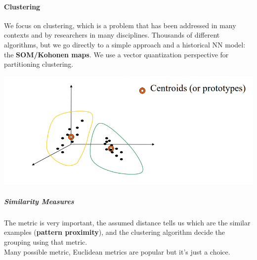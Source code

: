 \documentclass[10pt]{report}
\begin{document}
\paragraph{Clustering} We focus on clustering, which is a problem that has been addressed in many contexts and by researchers in many disciplines. Thousands of different algorithms, but we go directly to a simple approach and a historical NN model: the \textbf{SOM/Kohonen maps}. We use a vector quantization perspective for partitioning clustering.
\begin{center}
	\includegraphics[scale=0.5]{31.png}
\end{center}
\subparagraph{Similarity Measures} The metric is very important, the assumed distance tells us which are the similar examples (\textbf{pattern proximity}), and the clustering algorithm decide the grouping using that metric.\\
Many possible metric, Euclidean metrics are popular but it's just a choice.
\end{document}
